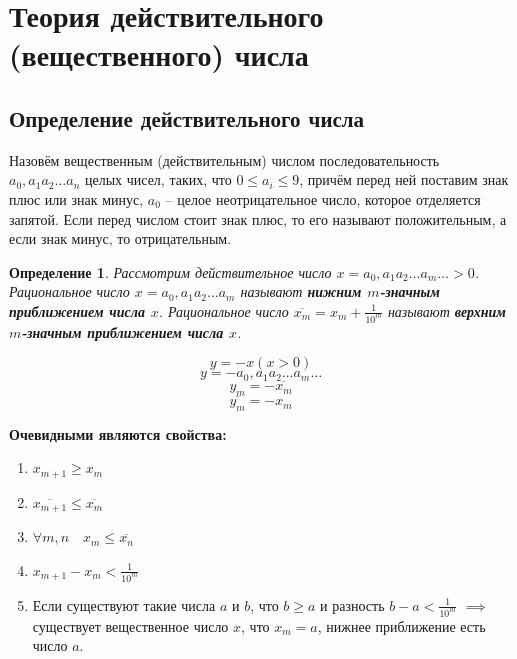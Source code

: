 \documentclass{article}
\theoremstyle{break}
\newtheorem{definition}{Определение}[subsection]
\begin{document}
\section{Теория действительного (вещественного) числа}

\subsection{Определение действительного числа}

Назовём вещественным (действительным) числом последовательность
$a_0,a_1 a_2 \dots a_n$ целых чисел, таких, что $0 \le a_i \le 9$,
причём перед ней поставим знак плюс или знак минус,
$a_0$ -- целое неотрицательное число, которое отделяется запятой.
Если перед числом стоит знак плюс, то его называют положительным,
а если знак минус, то отрицательным.

\begin{definition}
    Рассмотрим действительное число $x = a_0,a_1 a_2 \dots a_m \dots > 0$.
    Рациональное число $x = a_0,a_1 a_2 \dots a_m$ называют
    \textbf{нижним $m$-значным приближением числа $x$}.
    Рациональное число $\overline{x_m} = x_m + \frac{1}{10^m}$ называют
    \textbf{верхним $m$-значным приближением числа $x$}.
\end{definition}

\[y = -x (x > 0)\]
\[y = -a_0,a_1 a_2 \dots a_m \dots\]
\[y_m = -\overline{x_m}\]
\[\overline{y_m} = -x_m\]

\textbf{Очевидными являются свойства:}
\begin{enumerate}
    \item $x_{m+1} \ge x_m$
    \item $\overline{x_{m+1}} \le \overline{x_m}$
    \item $\forall m,n \quad x_m \le \overline{x_n}$
    \item $x_{m+1} - x_m < \frac{1}{10^m}$
    \item Если существуют такие числа $a$ и $b$, что $b \ge a$
    и разность $b - a < \frac{1}{10^m}$ $\implies$ существует
    вещественное число $x$, что $x_m = a$, нижнее приближение есть число $a$.
\end{enumerate}
\end{document}
